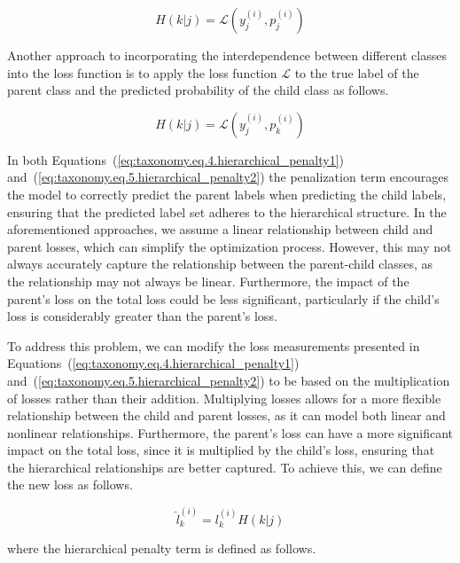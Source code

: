 \begin{equation}
    H(k \vert j)=\mathcal{L} \left(y_j^{(i)},p_j^{(i)}\right)
    \label{eq:taxonomy.eq.4.hierarchical_penalty1}
\end{equation}

Another approach to incorporating the interdependence between different classes into the loss function is to apply the loss function $\mathcal{L} $ to the true label of the parent class and the predicted probability of the child class as follows.

\begin{equation}
    H\left(k\vert j\right) = \mathcal{L} \left(y_j^{(i)},p_k^{(i)}\right)
    \label{eq:taxonomy.eq.5.hierarchical_penalty2}
\end{equation}

In both Equations~(\ref{eq:taxonomy.eq.4.hierarchical_penalty1}) and~(\ref{eq:taxonomy.eq.5.hierarchical_penalty2}) the penalization term encourages the model to correctly predict the parent labels when predicting the child labels, ensuring that the predicted label set adheres to the hierarchical structure. In the aforementioned approaches, we assume a linear relationship between child and parent losses, which can simplify the optimization process. However, this may not always accurately capture the relationship between the parent-child classes, as the relationship may not always be linear. Furthermore, the impact of the parent's loss on the total loss could be less significant, particularly if the child's loss is considerably greater than the parent's loss.

To address this problem, we can modify the loss measurements presented in Equations~(\ref{eq:taxonomy.eq.4.hierarchical_penalty1}) and~(\ref{eq:taxonomy.eq.5.hierarchical_penalty2})  to be based on the multiplication of losses rather than their addition. Multiplying losses allows for a more flexible relationship between the child and parent losses, as it can model both linear and nonlinear relationships. Furthermore, the parent's loss can have a more significant impact on the total loss, since it is multiplied by the child's loss, ensuring that the hierarchical relationships are better captured. To achieve this, we can define the new loss as follows.

\begin{equation}
    \label{eq:taxonomy.eq.7.newloss}
    \widehat{l}_k^{(i)} = l_k^{(i)} H \left( k \vert j \right)
\end{equation}

where the hierarchical penalty term is defined as follows.

